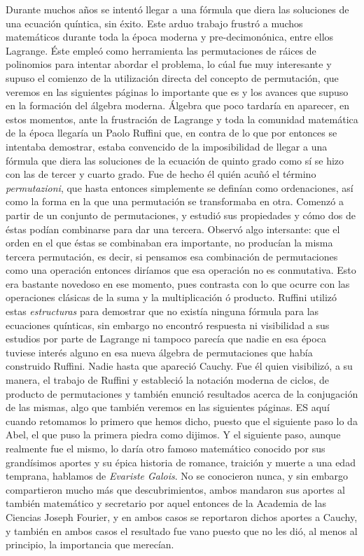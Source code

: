 \documentclass[12pt]{article}
\begin{document}
Durante muchos años se intentó llegar a una fórmula que diera las soluciones de una ecuación quíntica, sin éxito. Este arduo trabajo frustró a muchos matemáticos durante toda la época moderna y pre-decimonónica, entre ellos Lagrange. Éste empleó como herramienta las permutaciones de ráices de polinomios para intentar abordar el problema, lo cúal fue muy interesante y supuso el comienzo de la utilización directa del concepto de permutación, que veremos en las siguientes páginas lo importante que es y los avances que supuso en la formación del álgebra moderna. Álgebra que poco tardaría en aparecer, en estos momentos, ante la frustración de Lagrange y toda la comunidad matemática de la época llegaría un Paolo Ruffini que, en contra de lo que por entonces se intentaba demostrar, estaba convencido de la imposibilidad de llegar a una fórmula que diera las soluciones de la ecuación de quinto grado como sí se hizo con las de tercer y cuarto grado. Fue de hecho él quién acuñó el término \textit{permutazioni}, que hasta entonces simplemente se definían como ordenaciones, así como la forma en la que una permutación se transformaba en otra. Comenzó a partir de un conjunto de permutaciones, y estudió sus propiedades y cómo dos de éstas podían combinarse para dar una tercera. Observó algo intersante: que el orden en el que éstas se combinaban era importante, no producían la misma tercera permutación, es decir, si pensamos esa combinación de permutaciones como una operación entonces diríamos que esa operación no es conmutativa. Esto era bastante novedoso en ese momento, pues contrasta con lo que ocurre con las operaciones clásicas de la suma y la multiplicación ó producto. Ruffini utilizó estas \textit{estructuras} para demostrar que no existía ninguna fórmula para las ecuaciones quínticas, sin embargo no encontró respuesta ni visibilidad a sus estudios por parte de Lagrange ni tampoco parecía que nadie en esa época tuviese interés alguno en esa nueva álgebra de permutaciones que había construido Ruffini. Nadie hasta que apareció Cauchy. Fue él quien visibilizó, a su manera, el trabajo de Ruffini y estableció la notación moderna de ciclos, de producto de permutaciones y también enunció resultados acerca de la conjugación de las mismas, algo que también veremos en las siguientes páginas. ES aquí cuando retomamos lo primero que hemos dicho, puesto que el siguiente paso lo da Abel, el que puso la primera piedra como dijimos. Y el siguiente paso, aunque realmente fue el mismo, lo daría otro famoso matemático conocido por sus grandísimos aportes y su épica historia de romance, traición y muerte a una edad temprana, hablamos de \textit{Evariste Galois}. No se conocieron nunca, y sin embargo compartieron mucho más que descubrimientos, ambos mandaron sus aportes al también matemático y secretario por aquel entonces de la Academia de las Ciencias Joseph Fourier, y en ambos casos se reportaron dichos aportes a Cauchy, y también en ambos casos el resultado fue vano puesto que no les dió, al menos al principio, la importancia que merecían.
\end{document}

